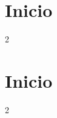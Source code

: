 


\section*{Inicio}

\begin{multicols}{2}
\raggedcolumns



\end{multicols}




\limpar


\section*{Inicio}

\begin{multicols}{2}
\raggedcolumns


    
\end{multicols}

